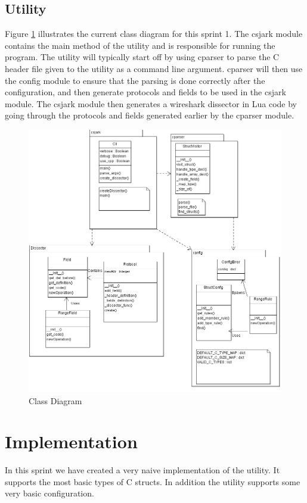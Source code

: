 \subsection{Utility}
Figure \ref{fig:sp1_class} illustrates the current class diagram for this
sprint 1. The csjark module contains the main method of the utility and is
responsible for running the program. The utility will typically start off by
using cparser to parse the C header file given to the utility as a command line
argument. cparser will then use the config module to ensure that the parsing is
done correctly after the configuration, and then generate protocols and fields
to be used in the csjark module. The csjark module then generates a wireshark
dissector in Lua code by going through the protocols and fields generated
earlier by the cparser module.

\begin{figure}[!ht]
	\center
	\includegraphics[width=\textwidth]{./sprints/img/class_diagram_s1.png}
	\caption{Class Diagram\label{fig:sp1_class}}
\end{figure}


\section{Implementation}
In this sprint we have created a very naive implementation of the utility. It
supports the most basic types of C structs. In addition the utility supports
some very basic configuration.

